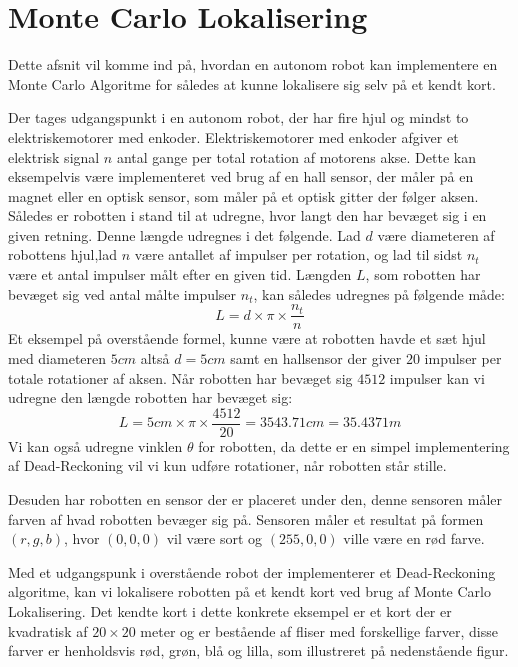 \documentclass[../../SRP.tex]{subfiles}
\begin{document}
\chapter{Monte Carlo Lokalisering}
Dette afsnit vil komme ind på, hvordan en autonom robot kan implementere en Monte Carlo Algoritme for således at kunne lokalisere sig selv på et kendt kort.  

 Der tages udgangspunkt i en autonom robot, der har fire hjul og mindst to elektriskemotorer med enkoder. Elektriskemotorer med enkoder afgiver et elektrisk signal $n$ antal gange per total rotation af motorens akse. Dette kan eksempelvis være implementeret ved brug af en hall sensor, der måler på en magnet eller en optisk sensor, som måler på et optisk gitter der følger aksen. Således er robotten i stand til at udregne, hvor langt den har bevæget sig i en given retning. Denne længde udregnes i det følgende. Lad $d$ være diameteren af robottens hjul,lad $n$ være antallet af impulser per rotation, og lad til sidst $n_t$ være et antal impulser målt efter en given tid. Længden $L$, som robotten har bevæget sig ved antal målte impulser $n_t$, kan således udregnes på følgende måde:
\begin{equation}
  L = d \times \pi \times \frac{n_t}{n}
\end{equation}
Et eksempel på overstående formel, kunne være at robotten havde et sæt hjul med diameteren $5cm$ altså $d = 5cm$ samt en hallsensor der giver $20$ impulser per totale rotationer af aksen. Når robotten har bevæget sig $4512$ impulser kan vi udregne den længde robotten har bevæget sig:
\begin{equation}
  L = 5cm \times \pi \times \frac{4512}{20} = 3543.71cm = 35.4371m
\end{equation}
Vi kan også udregne vinklen $\theta$ for robotten, da dette er en simpel implementering af Dead-Reckoning vil vi kun udføre rotationer, når robotten står stille.

Desuden har robotten en sensor der er placeret under den, denne sensoren måler farven af hvad robotten bevæger sig på. Sensoren måler et resultat på formen $(r,g,b)$, hvor $(0,0,0)$ vil være sort og $(255,0,0)$ ville være en rød farve. 

Med et udgangspunk i overstående robot der implementerer et Dead-Reckoning algoritme, kan vi lokalisere robotten på et kendt kort ved brug af Monte Carlo Lokalisering. Det kendte kort i dette konkrete eksempel er et kort der er kvadratisk af $20 \times 20$ meter og er bestående af fliser med forskellige farver, disse farver er henholdsvis rød, grøn, blå og lilla, som illustreret på nedenstående figur.
\end{document}
